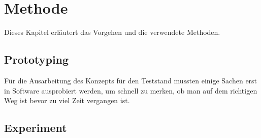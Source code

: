 \chapter{Methode}\label{ch:Methode}


Dieses Kapitel erläutert das Vorgehen und die verwendete Methoden.

\section{Prototyping}

Für die Ausarbeitung des Konzepts für den Teststand mussten einige Sachen erst in Software ausprobiert werden, um schnell zu merken, ob man auf dem richtigen Weg ist bevor zu viel Zeit vergangen ist.


\parencite{helmut_balzert_wissenschaftliches_nodate}

\section{Experiment}\label{sec:experiment}

